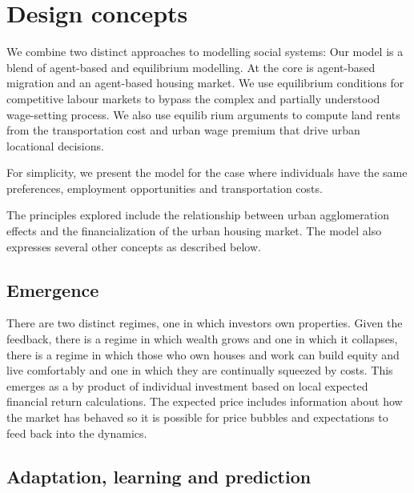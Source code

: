 \section{Design concepts}



We combine two distinct approaches to modelling social systems: Our model is a blend of agent-based and equilibrium modelling. At the core is  agent-based migration and an agent-based housing market. We use equilibrium conditions for competitive labour markets to bypass the complex and partially understood wage-setting process. We also use equilib rium arguments to compute land rents from the transportation cost and urban wage premium that drive urban locational decisions. 

For simplicity, we present the model for the case where individuals have the same preferences, employment opportunities and transportation costs.

The principles explored include the relationship between urban agglomeration effects and the financialization of the urban housing market. The model also expresses several other concepts as described below.

\subsection{Emergence}
There are two distinct regimes, one in which investors own properties. Given the feedback, there is a regime in which wealth grows and one in which it collapses, there is a regime in which those who own houses and work can build equity and live comfortably and one in which they are continually squeezed by costs. This emerges as a by product of individual investment based on local expected financial return calculations. 
The expected price includes information about how the market has behaved so it is possible for price bubbles and expectations to feed back into the dynamics. 

\subsection{Adaptation, learning and prediction}

